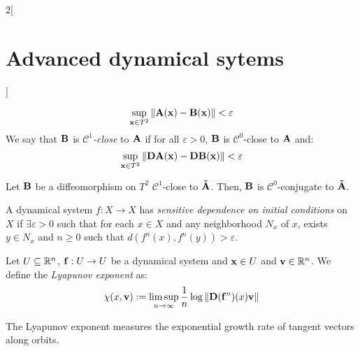 \documentclass[../../../main_math.tex]{subfiles}
\begin{document}
\begin{multicols}{2}[\section{Advanced dynamical sytems}]
\begin{definition}
    $$
      \sup_{\boldsymbol{\mathrm{x}}\in T^2}\left\|\boldsymbol{\mathrm{A}}(\boldsymbol{\mathrm{x}})-\boldsymbol{\mathrm{B}}(\boldsymbol{\mathrm{x}})\right\|<\varepsilon
    $$
    We say that $\boldsymbol{\mathrm{B}}$ is \emph{$\mathcal{C}^1$-close} to $\boldsymbol{\mathrm{A}}$ if for all $\varepsilon>0$, $\boldsymbol{\mathrm{B}}$ is $\mathcal{C}^0$-close to $\boldsymbol{\mathrm{A}}$ and:
    $$
      \sup_{\boldsymbol{\mathrm{x}}\in T^2}\left\|\boldsymbol{\mathrm{D}}\boldsymbol{\mathrm{A}}(\boldsymbol{\mathrm{x}})-\boldsymbol{\mathrm{D}}\boldsymbol{\mathrm{B}}(\boldsymbol{\mathrm{x}})\right\|<\varepsilon
    $$
  \end{definition}
  \begin{theorem}
    Let $\boldsymbol{\mathrm{B}}$ be a diffeomorphism on $T^2$ $\mathcal{C}^1$-close to $\boldsymbol{\mathrm{\tilde{A}}}$. Then, $\boldsymbol{\mathrm{B}}$ is $\mathcal{C}^0$-conjugate to $\boldsymbol{\mathrm{\tilde{A}}}$.
  \end{theorem}
  \begin{definition}
    A dynamical system $f : X\rightarrow X$ has \emph{sensitive dependence on initial conditions} on $X$ if $\exists\varepsilon >0$ such that for each $x\in X$ and any neighborhood $N_x$ of $x$, exists $y \in N_x$ and $n \geq  0$ such that $d(f^n(x),f^n(y)) > \varepsilon$.
  \end{definition}
  \begin{definition}
    Let $U\subseteq \mathbb{R}^n$, $\boldsymbol{\mathrm{f}}:U\to U$ be a dynamical system and $\boldsymbol{\mathrm{x}}\in U$ and $\boldsymbol{\mathrm{v}}\in\mathbb{R}^n$. We define the \emph{Lyapunov exponent} as:
    $$
      \chi(x,\boldsymbol{\mathrm{v}}):=\limsup_{n\to\infty}\frac{1}{n}\log\left\|\boldsymbol{\mathrm{D}}(\boldsymbol{\mathrm{f}}^n)(x)\boldsymbol{\mathrm{v}}\right\|
    $$
  \end{definition}
  \begin{remark}
    The Lyapunov exponent measures the exponential growth rate of tangent vectors along orbits.
  \end{remark}
\end{multicols}
\end{document}
